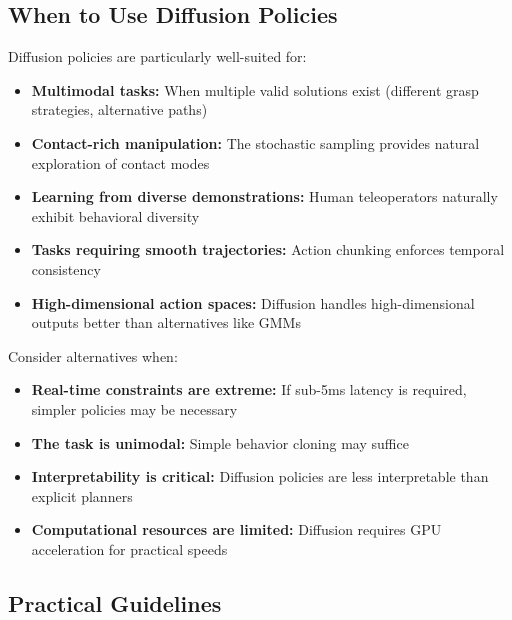 \subsection{When to Use Diffusion Policies}

Diffusion policies are particularly well-suited for:

\begin{itemize}
    \item \textbf{Multimodal tasks:} When multiple valid solutions exist (different grasp strategies, alternative paths)

    \item \textbf{Contact-rich manipulation:} The stochastic sampling provides natural exploration of contact modes

    \item \textbf{Learning from diverse demonstrations:} Human teleoperators naturally exhibit behavioral diversity

    \item \textbf{Tasks requiring smooth trajectories:} Action chunking enforces temporal consistency

    \item \textbf{High-dimensional action spaces:} Diffusion handles high-dimensional outputs better than alternatives like GMMs
\end{itemize}

Consider alternatives when:

\begin{itemize}
    \item \textbf{Real-time constraints are extreme:} If sub-5ms latency is required, simpler policies may be necessary

    \item \textbf{The task is unimodal:} Simple behavior cloning may suffice

    \item \textbf{Interpretability is critical:} Diffusion policies are less interpretable than explicit planners

    \item \textbf{Computational resources are limited:} Diffusion requires GPU acceleration for practical speeds
\end{itemize}

\subsection{Practical Guidelines}


